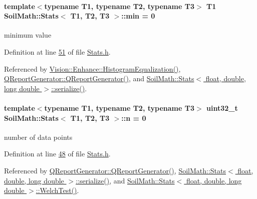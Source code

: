 \hypertarget{class_soil_math_1_1_stats_aa44c07a23b1c2ce0f0407e7cee4f39a9}{}
\paragraph[{min}]{\setlength{\rightskip}{0pt plus 5cm}template$<$typename T1, typename T2, typename T3$>$ T1 {\bf Soil\+Math\+::\+Stats}$<$ T1, T2, T3 $>$\+::min = 0}\label{class_soil_math_1_1_stats_aa44c07a23b1c2ce0f0407e7cee4f39a9}
minimum value 

Definition at line \hyperlink{_stats_8h_source_l00051}{51} of file \hyperlink{_stats_8h_source}{Stats.\+h}.



Referenced by \hyperlink{_enhance_8cpp_source_l00277}{Vision\+::\+Enhance\+::\+Histogram\+Equalization()}, \hyperlink{qreportgenerator_8cpp_source_l00004}{Q\+Report\+Generator\+::\+Q\+Report\+Generator()}, and \hyperlink{_stats_8h_source_l00651}{Soil\+Math\+::\+Stats$<$ float, double, long double $>$\+::serialize()}.

\hypertarget{class_soil_math_1_1_stats_a7bc57af334b68253832ebac17f85d091}{}
\paragraph[{n}]{\setlength{\rightskip}{0pt plus 5cm}template$<$typename T1, typename T2, typename T3$>$ {\bf uint32\+\_\+t} {\bf Soil\+Math\+::\+Stats}$<$ T1, T2, T3 $>$\+::n = 0}\label{class_soil_math_1_1_stats_a7bc57af334b68253832ebac17f85d091}
number of data points 

Definition at line \hyperlink{_stats_8h_source_l00048}{48} of file \hyperlink{_stats_8h_source}{Stats.\+h}.



Referenced by \hyperlink{qreportgenerator_8cpp_source_l00004}{Q\+Report\+Generator\+::\+Q\+Report\+Generator()}, \hyperlink{_stats_8h_source_l00651}{Soil\+Math\+::\+Stats$<$ float, double, long double $>$\+::serialize()}, and \hyperlink{_stats_8h_source_l00075}{Soil\+Math\+::\+Stats$<$ float, double, long double $>$\+::\+Welch\+Test()}.

\hypertarget{class_soil_math_1_1_stats_a4202c9085eacaff2e04eda84fc90e92b}{}
